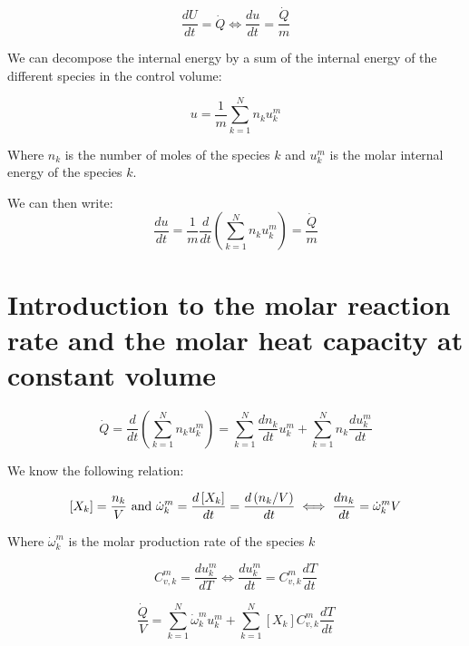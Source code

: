 \documentclass[11pt, a4paper]{article} %
\begin{document}
\begin{equation}
    \frac{dU}{dt} = \dot{Q} \iff \frac{du}{dt} = \frac{\dot{Q}}{m}
\end{equation}

We can decompose the internal energy by a sum of the internal energy of the different species in the control volume:

\begin{equation}
    u = \frac{1}{m} \sum_{k=1}^{N} n_k u_k^m
\end{equation}

Where $n_k$ is the number of moles of the species $k$ and $u_k^m$ is the molar internal energy of the species $k$.

We can then write:
\begin{equation}
    \boxed{
        \frac{du}{dt} = \frac{1}{m} \frac{d}{dt} \left( \sum_{k=1}^{N} n_k u_k^m \right) = \frac{\dot{Q}}{m}
    }
\end{equation}


\section{Introduction to the molar reaction rate and the molar heat capacity at constant volume}

\begin{equation}
    \dot{Q} = \frac{d}{dt} \left( \sum_{k=1}^{N} n_k u_k^m \right) = \sum_{k=1}^{N} \frac{dn_k}{dt} u_k^m + \sum_{k=1}^{N} n_k \frac{du_k^m}{dt}
\end{equation}

We know the following relation:


\begin{equation}
    \left[ X_k \right] = \frac{n_k}{V}
    \\
    \text{ and }
    \\
    \dot{\omega}_k^m = \frac{d \left[ X_k \right] }{dt} = \frac{d \left( n_k/V \right) }{dt} \iff \frac{dn_k}{dt} = \dot{\omega}_k^m V
\end{equation}

Where $\dot{\omega}_k^m$ is the molar production rate of the species $k$

\begin{equation}
    C^m_{v,k} = \frac{du_k^m}{dT} \iff \frac{du_k^m}{dt} = C^m_{v,k} \frac{dT}{dt}
\end{equation}

\begin{equation}
    \boxed{
        \frac{\dot{Q}}{V} = \sum_{k=1}^{N} \dot{\omega}_k^m u_k^m + \sum_{k=1}^{N} \left[ X_k \right] C^m_{v,k} \frac{dT}{dt}
    }
\end{equation}
\end{document}
